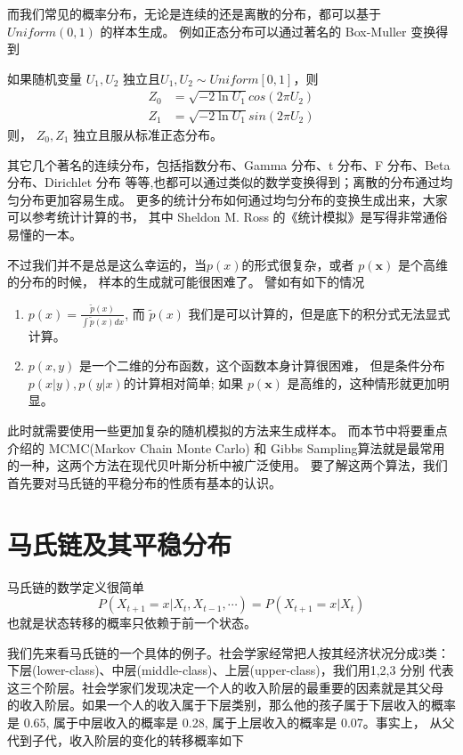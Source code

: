 而我们常见的概率分布，无论是连续的还是离散的分布，都可以基于$Uniform(0,1)$ 的样本生成。
例如正态分布可以通过著名的 Box-Muller 变换得到
\begin{theorem}
如果随机变量 $U_1, U_2$ 独立且$U_1, U_2 \sim Uniform[0,1]$，则
\begin{align*}
Z_0 & = \sqrt{-2\ln U_1} cos(2\pi U_2) \\
Z_1 & = \sqrt{-2\ln U_1} sin(2\pi U_2)
\end{align*}
则， $Z_0,Z_1$ 独立且服从标准正态分布。
\end{theorem}

其它几个著名的连续分布，包括指数分布、Gamma 分布、t 分布、F 分布、Beta 分布、Dirichlet 分布
等等,也都可以通过类似的数学变换得到；离散的分布通过均匀分布更加容易生成。
更多的统计分布如何通过均匀分布的变换生成出来，大家可以参考统计计算的书，
其中 Sheldon M. Ross 的《统计模拟》是写得非常通俗易懂的一本。

不过我们并不是总是这么幸运的，当$p(x)$的形式很复杂，或者 $p(\mathbf{x})$ 是个高维的分布的时候，
样本的生成就可能很困难了。 譬如有如下的情况
\begin{enumerate}
\item  $\displaystyle p(x) = \frac{\tilde{p}(x)}{\int \tilde{p}(x) dx}$,
而 $\tilde{p}(x)$ 我们是可以计算的，但是底下的积分式无法显式计算。
\item $p(x,y)$ 是一个二维的分布函数，这个函数本身计算很困难，
但是条件分布 $p(x|y),p(y|x)$的计算相对简单;
如果 $p(\mathbf{x})$ 是高维的，这种情形就更加明显。
\end{enumerate}

此时就需要使用一些更加复杂的随机模拟的方法来生成样本。
而本节中将要重点介绍的 MCMC(Markov Chain Monte Carlo) 和
Gibbs Sampling算法就是最常用的一种，这两个方法在现代贝叶斯分析中被广泛使用。
要了解这两个算法，我们首先要对马氏链的平稳分布的性质有基本的认识。

\section{马氏链及其平稳分布}
马氏链的数学定义很简单
$$ P(X_{t+1}=x|X_t, X_{t-1}, \cdots) =P(X_{t+1}=x|X_t) $$
也就是状态转移的概率只依赖于前一个状态。

我们先来看马氏链的一个具体的例子。社会学家经常把人按其经济状况分成3类：
下层(lower-class)、中层(middle-class)、上层(upper-class)，我们用1,2,3 分别
代表这三个阶层。社会学家们发现决定一个人的收入阶层的最重要的因素就是其父母
的收入阶层。如果一个人的收入属于下层类别，那么他的孩子属于下层收入的概率是
0.65, 属于中层收入的概率是 0.28, 属于上层收入的概率是 0.07。事实上，
从父代到子代，收入阶层的变化的转移概率如下

